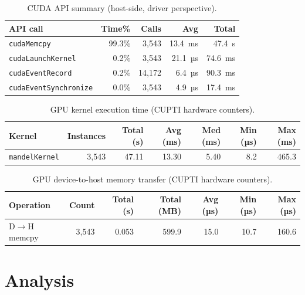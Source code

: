 \documentclass[
	english,
	letterpaper, oneside
]{article}
\begin{document}
\begin{table}[H]
    \centering
    \caption{CUDA API summary (host-side, driver perspective).}
    \label{tab:cuda-api}
    \begin{tabular}{lrrrr}
        \hline
        API call & Time\% & Calls & Avg & Total \\
        \hline
        \texttt{cudaMemcpy}          & 99.3\% & 3{,}543 & 13.4~ms    & 47.4~s   \\
        \texttt{cudaLaunchKernel}    &  0.2\% & 3{,}543 & 21.1~µs    & 74.6~ms  \\
        \texttt{cudaEventRecord}     &  0.2\% & 14{,}172& 6.4~µs     & 90.3~ms  \\
        \texttt{cudaEventSynchronize}&  0.0\% & 3{,}543 & 4.9~µs     & 17.4~ms  \\
        \hline
    \end{tabular}
\end{table}

\begin{table}[H]
    \centering
    \caption{GPU kernel execution time (CUPTI hardware counters).}
    \label{tab:gpu-kernel}
    \begin{tabular}{lrrrrrr}
        \hline
        Kernel & Instances & Total (s) & Avg (ms) & Med (ms) & Min (µs) & Max (ms) \\
        \hline
        \texttt{mandelKernel} & 3{,}543 & 47.11 & 13.30 & 5.40 & 8.2 & 465.3 \\
        \hline
    \end{tabular}
\end{table}

\begin{table}[H]
    \centering
    \caption{GPU device-to-host memory transfer (CUPTI hardware counters).}
    \label{tab:memcpy}
    \begin{tabular}{lrrrrrr}
        \hline
        Operation & Count & Total (s) & Total (MB) & Avg (µs) & Min (µs) & Max (µs) \\
        \hline
        D$\rightarrow$H memcpy & 3{,}543 & 0.053 & 599.9 & 15.0 & 10.7 & 160.6 \\
        \hline
    \end{tabular}
\end{table}

\section{Analysis}
\end{document}
